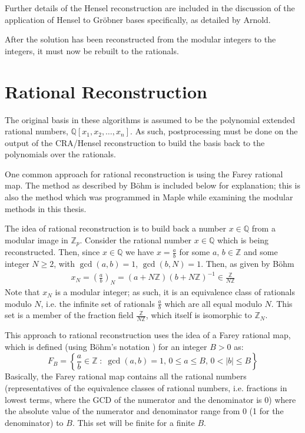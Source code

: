 \documentclass[letterpaper,12pt,titlepage,oneside,final]{book}
\begin{document}
Further details of the Hensel reconstruction are included in the discussion of the application of Hensel to Gr\"obner bases specifically, as detailed by Arnold.

After the solution has been reconstructed from the modular integers to the integers, it must now be rebuilt to the rationals.

\section{Rational Reconstruction}

The original basis in these algorithms is assumed to be the polynomial extended rational numbers, ${\mathbb{Q}[x_1, x_2, \ldots, x_n]}$.  As such, postprocessing must be done on the output of the CRA/Hensel reconstruction to build the basis back to the polynomials over the rationals.  

One common approach for rational reconstruction is using the Farey rational map.  The method as described by B\"ohm is included below for explanation; this is also the method which was programmed in Maple while examining the modular methods in this thesis.

The idea of rational reconstruction is to build back a number ${x \in \mathbb{Q}}$ from a modular image in ${\mathbb{Z}_p}$.  Consider the rational number ${x \in \mathbb{Q}}$ which is being reconstructed.  Then, since ${x \in \mathbb{Q}}$ we have ${x = \frac{a}{b}}$ for some ${a,\,b \in \mathbb{Z}}$ and some integer ${N \geq 2}$, with ${\gcd(a, b) = 1}$, ${\gcd(b, N) = 1}$.
Then, as given by B\"ohm \cite{Bohm}
\begin{align*}
  x_N = \left(\frac{a}{b}\right)_N = (a + N\mathbb{Z})(b + N\mathbb{Z})^{-1} \in \frac{\mathbb{Z}}{N\mathbb{Z}} 
\end{align*}   
Note that ${x_N}$ is a modular integer; as such, it is an equivalence class of rationals modulo ${N}$, i.e. the infinite set of rationals ${\frac{a}{b}}$ which are all equal modulo ${N}$.  This set is a member of the fraction field ${\frac{\mathbb{Z}}{N\mathbb{Z}}}$, which itself is isomorphic to ${\mathbb{Z}_N}$.

This approach to rational reconstruction uses the idea of a Farey rational map, which is defined (using B\"ohm's notation \cite{Bohm}) for an integer ${B > 0}$ as:
\begin{equation*}
  F_B = \left\{\frac{a}{b} \in \mathbb{Z}\; : \; \gcd(a, b) = 1,\, 0 \leq a \leq B,\, 0 < |b| \leq B\right\}
\end{equation*}
Basically, the Farey rational map contains all the rational numbers (representatives of the equivalence classes of rational numbers, i.e. fractions in lowest terms, where the GCD of the numerator and the denominator is 0) where the absolute value of the numerator and denominator range from 0 (1 for the denominator) to ${B}$.  This set will be finite for a finite ${B}$.
\end{document}
